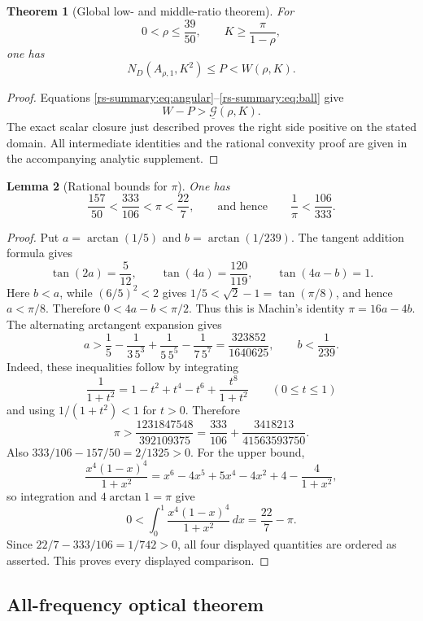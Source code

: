 \documentclass[11pt]{article}
\numberwithin{equation}{section}
\newtheorem{theorem}{Theorem}[section]
\newtheorem{lemma}[theorem]{Lemma}
\theoremstyle{definition}
\theoremstyle{remark}
\begin{document}
\begin{theorem}[Global low- and middle-ratio theorem]
\label{rs:thm:global-proxy}
For
\[
 0<\rho\leq\frac{39}{50},
 \qquad K\geq\frac\pi{1-\rho},
\]
one has
\[
 N_D(A_{\rho,1},K^2)\leq P<W(\rho,K).
\]
\end{theorem}

\begin{proof}
Equations \eqref{rs-summary:eq:angular}--\eqref{rs-summary:eq:ball}
give
\[
 W-P>\underline{\mathcal G}(\rho,K).
\]
The exact scalar closure just described proves the right side positive on
the stated domain.  All intermediate identities and the rational
convexity proof are given in the accompanying analytic supplement.
\end{proof}

\begin{lemma}[Rational bounds for \(\pi\)]
\label{lem:rational-pi-bounds}
One has
\[
 \frac{157}{50}<\frac{333}{106}<\pi<\frac{22}{7},
 \qquad\text{and hence}\qquad \frac1\pi<\frac{106}{333}.
\]
\end{lemma}

\begin{proof}
Put \(a=\arctan(1/5)\) and \(b=\arctan(1/239)\).  The tangent addition
formula gives
\[
 \tan(2a)=\frac5{12},\qquad
 \tan(4a)=\frac{120}{119},\qquad
 \tan(4a-b)=1.
\]
Here \(b<a\), while \((6/5)^2<2\) gives
\(1/5<\sqrt2-1=\tan(\pi/8)\), and hence \(a<\pi/8\).  Therefore
\(0<4a-b<\pi/2\).  Thus this is Machin's identity
\(\pi=16a-4b\).  The alternating arctangent expansion gives
\[
 a>\frac15-\frac1{3\,5^3}+\frac1{5\,5^5}-\frac1{7\,5^7}
  =\frac{323852}{1640625},
 \qquad b<\frac1{239}.
\]
Indeed, these inequalities follow by integrating
\[
 \frac1{1+t^2}=1-t^2+t^4-t^6+\frac{t^8}{1+t^2}
 \qquad(0\leq t\leq1)
\]
and using \(1/(1+t^2)<1\) for \(t>0\).
Therefore
\[
 \pi>
 \frac{1231847548}{392109375}
 =\frac{333}{106}+\frac{3418213}{41563593750}.
\]
Also \(333/106-157/50=2/1325>0\).  For the upper bound,
\[
 \frac{x^4(1-x)^4}{1+x^2}
 =x^6-4x^5+5x^4-4x^2+4-\frac4{1+x^2},
\]
so integration and \(4\arctan1=\pi\) give
\[
 0<\int_0^1\frac{x^4(1-x)^4}{1+x^2}\,dx
 =\frac{22}{7}-\pi.
\]
Since \(22/7-333/106=1/742>0\), all four displayed quantities are ordered
as asserted.
This proves every displayed comparison.
\end{proof}

\subsection{All-frequency optical theorem}
\end{document}
